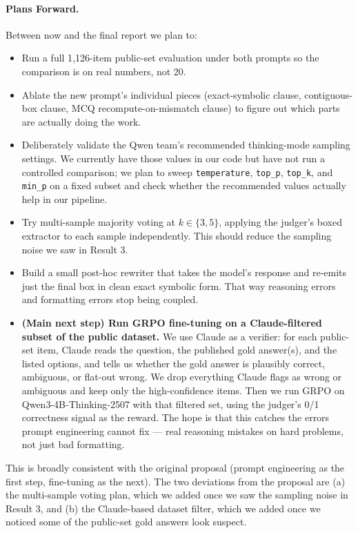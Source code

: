 \documentclass{article}
\begin{document}
\paragraph{Plans Forward.}
Between now and the final report we plan to:
\begin{itemize}
    \item Run a full 1{,}126-item public-set evaluation under both
    prompts so the comparison is on real numbers, not 20.
    \item Ablate the new prompt's individual pieces (exact-symbolic
    clause, contiguous-box clause, MCQ recompute-on-mismatch clause)
    to figure out which parts are actually doing the work.
    \item Deliberately validate the Qwen team's recommended
    thinking-mode sampling settings. We currently have those values
    in our code but have not run a controlled comparison; we plan to
    sweep \texttt{temperature}, \texttt{top\_p}, \texttt{top\_k}, and
    \texttt{min\_p} on a fixed subset and check whether the
    recommended values actually help in our pipeline.
    \item Try multi-sample majority voting at $k \in \{3, 5\}$,
    applying the judger's boxed extractor to each sample
    independently. This should reduce the sampling noise we saw in
    Result 3.
    \item Build a small post-hoc rewriter that takes the model's
    response and re-emits just the final box in clean exact symbolic
    form. That way reasoning errors and formatting errors stop being
    coupled.
    \item \textbf{(Main next step) Run GRPO fine-tuning on a
    Claude-filtered subset of the public dataset.} We use Claude as
    a verifier: for each public-set item, Claude reads the question,
    the published gold answer(s), and the listed options, and tells
    us whether the gold answer is plausibly correct, ambiguous, or
    flat-out wrong. We drop everything Claude flags as wrong or
    ambiguous and keep only the high-confidence items. Then we run
    GRPO on Qwen3-4B-Thinking-2507 with that filtered set, using the
    judger's 0/1 correctness signal as the reward. The hope is that
    this catches the errors prompt engineering cannot fix --- real
    reasoning mistakes on hard problems, not just bad formatting.
\end{itemize}
This is broadly consistent with the original proposal (prompt
engineering as the first step, fine-tuning as the next). The two
deviations from the proposal are (a) the multi-sample voting plan,
which we added once we saw the sampling noise in Result 3, and
(b) the Claude-based dataset filter, which we added once we noticed
some of the public-set gold answers look suspect.
\end{document}
